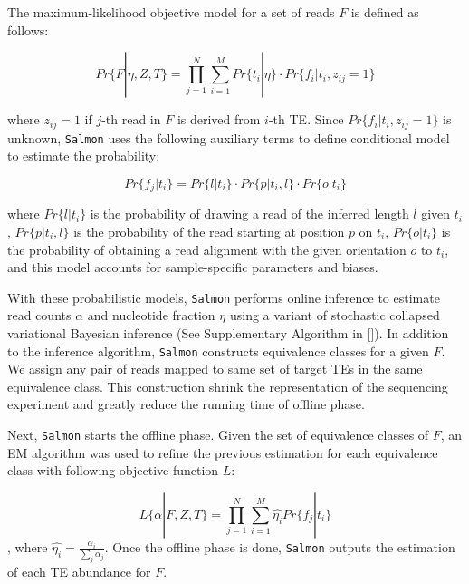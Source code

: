 \documentclass[wsdraft]{ws-procs11x85}
\begin{document}
The maximum-likelihood objective model for a set of reads $F$ is defined as follows:

\begin{equation} \label{eq:3}
Pr\{F|\eta,Z, T \}=
\prod_{j=1}^{N}\sum_{i=1}^{M} Pr\{ t_i | \eta \}  \cdot
 Pr \{ f_i | t_i, z_{ij}=1 \}
\end{equation}

where $z_{ij} = 1$ if $j$-th read in $F$ is derived from $i$-th TE. Since $Pr \{f_i| t_i, z_{ij}=1\}$ is unknown, \texttt{Salmon} uses the following auxiliary terms to define conditional model to estimate the probability:

\begin{equation}
Pr \{f_j | t_i \} = Pr \{ l | t_i \} 
\cdot Pr \{ p | t_i, l \} 
\cdot Pr \{ o | t_i \} 
\end{equation}

where $Pr \{ l | t_i \}$  is the probability of drawing a read of the inferred length $l$ given $t_i$,  
$Pr \{ p | t_i, l \}$ is the probability of the read starting at position $p$ on $t_i$,
$Pr \{ o | t_i \}$ is the probability of obtaining a read alignment with the given orientation $o$ to $t_i$, and this model accounts for sample-specific parameters and biases. 

With these probabilistic models, \texttt{Salmon} performs online inference to estimate read counts $\alpha$ and nucleotide fraction $\eta$ using a variant of stochastic collapsed variational Bayesian inference (See Supplementary Algorithm in []).\cite{foulds2013stochastic} In addition to  the inference algorithm, \texttt{Salmon} constructs equivalence classes for a given $F$. We assign any pair of reads mapped to same set of target TEs in the same equivalence class. This construction shrink the representation of the sequencing experiment and greatly reduce the running time of offline phase.\cite{patro2017salmon}

Next, \texttt{Salmon} starts the offline phase. Given the set of equivalence classes of $F$, an EM algorithm was used to refine the previous estimation for each equivalence class with following objective function $L$:

\begin{equation}
L\{\alpha| F, Z, T\} = \prod_{j=1}^{N} \sum_{i=1}^{M} \hat{\eta_i} Pr \{f_j|t_i\}
\end{equation},
where $\hat{\eta_i}=\frac{\alpha_i}{\sum_{j}\alpha_j}$. Once the offline phase is done, \texttt{Salmon}  outputs the estimation of each TE abundance for $F$.
\end{document}
